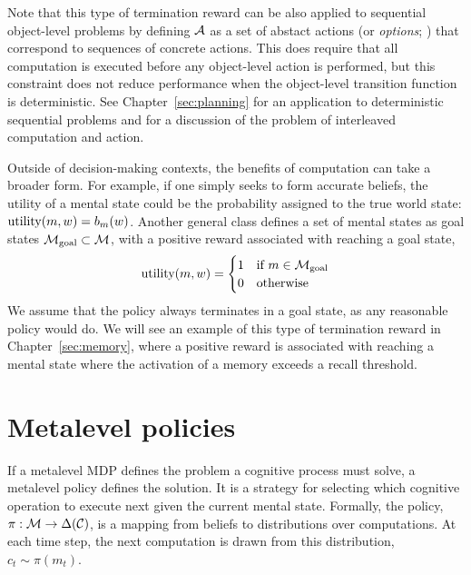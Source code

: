 Note that this type of termination reward can be also applied to sequential object-level problems by defining $\mathcal{A}$ as a set of abstact actions (or \emph{options}; \citealp{sutton1999mdps}) that correspond to sequences of concrete actions. This does require that all computation is executed before any object-level action is performed, but this constraint does not reduce performance when the object-level transition function is deterministic. See Chapter~\ref{sec:planning} for an application to deterministic sequential problems and  for a discussion of the problem of interleaved computation and action.

Outside of decision-making contexts, the benefits of computation can take a broader form. For example, if one simply seeks to form accurate beliefs, the utility of a mental state could be the probability assigned to the true world state: $\text{utility}(m, w) = b_m(w)$. Another general class defines a set of mental states as goal states $\mathcal{M}_{\mathrm{goal}} \subset \mathcal{M}$, with a positive reward associated with reaching a goal state,
%
\begin{equation}\label{eq:goal-term}
  \text{utility}(m, w) = \begin{cases}
    1 &\text{if } m \in \mathcal{M}_{\mathrm{goal}} \\
    0 &\text{otherwise}
  \end{cases}
\end{equation}
%
We assume that the policy always terminates in a goal state, as any reasonable policy would do. We will see an example of this type of termination reward in Chapter~\ref{sec:memory}, where a positive reward is associated with reaching a mental state where the activation of a memory exceeds a recall threshold.


\section{Metalevel policies}\label{sec:metamdp-policy}

If a metalevel MDP defines the problem a cognitive process must solve, a metalevel policy defines the solution. It is a strategy for selecting which cognitive operation to execute next given the current mental state. Formally, the policy, $\pi: \mathcal{M} \rightarrow \Delta(\mathcal{C})$, is a mapping from beliefs to distributions over computations. At each time step, the next computation is drawn from this distribution, $c_t \sim \pi(m_t)$.

